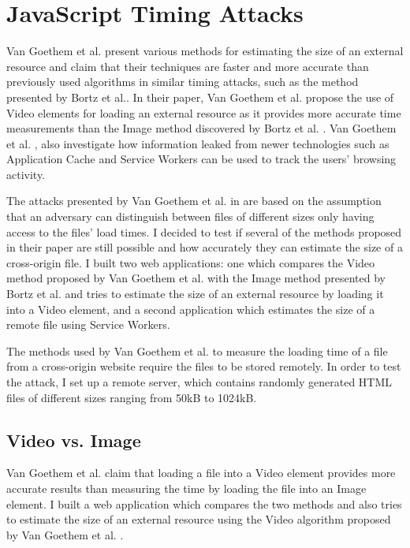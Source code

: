 \documentclass[10pt,a4paper,twoside]{book}
\begin{document}
\section{JavaScript Timing Attacks}
\label{vanpe}
Van Goethem et al. \cite{van2015clock} present various methods for estimating the size of an external resource and claim that their techniques are faster and more accurate than previously used algorithms in similar timing attacks, such as the method presented by Bortz et al.\cite{bortz2007exposing}. In their paper, Van Goethem et al. \cite{van2015clock} propose the use of Video elements for loading an external resource as it provides more accurate time measurements than the Image method discovered by Bortz et al. \cite{bortz2007exposing}. Van Goethem et al. \cite{van2015clock}, also investigate how information leaked from newer technologies such as Application Cache and Service Workers can be used to track the users' browsing activity.

The attacks presented by Van Goethem et al. in \cite{van2015clock} are based on the assumption that an adversary can distinguish between files of different sizes only having access to the files' load times. I decided to test if several of the methods proposed in their paper are still possible and how accurately they can estimate the size of a cross-origin file. I built two web applications: one which compares the Video method proposed by Van Goethem et al. \cite{van2015clock} with the Image method presented by Bortz et al. \cite{bortz2007exposing} and tries to estimate the size of an external resource by loading it into a Video element, and a second application which estimates the size of a remote file using Service Workers.

The methods used by Van Goethem et al. \cite{van2015clock} to measure the loading time of a file from a cross-origin website require the files to be stored remotely. In order to test the attack, I set up a remote server, which contains randomly generated HTML files of different sizes ranging from 50kB to 1024kB. 

\subsection{Video vs. Image}
\label{vvsi}
Van Goethem et al. \cite{van2015clock} claim that loading a file into a Video element provides more accurate results than measuring the time by loading the file into an Image element. I built a web application which compares the two methods and also tries to estimate the size of an external resource using the Video algorithm proposed by Van Goethem et al. \cite{van2015clock}.
\end{document}
